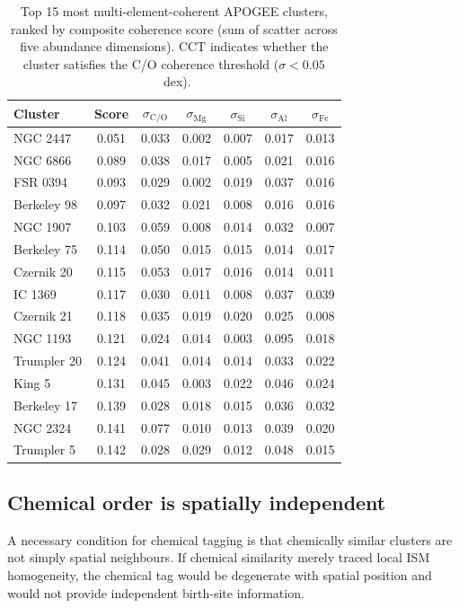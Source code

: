 \documentclass[fleqn,usenatbib]{mnras}
\begin{document}
\begin{table}
\centering
\caption{Top 15 most multi-element-coherent APOGEE clusters, ranked by composite coherence score (sum of scatter across five abundance dimensions). CCT indicates whether the cluster satisfies the C/O coherence threshold ($\sigma < 0.05$~dex).}
\label{tab:coherent_clusters}
\begin{tabular}{lcccccc}
\toprule
Cluster & Score & $\sigma_{\mathrm{C/O}}$ & $\sigma_{\mathrm{Mg}}$ & $\sigma_{\mathrm{Si}}$ & $\sigma_{\mathrm{Al}}$ & $\sigma_{\mathrm{Fe}}$ \\
\midrule
NGC 2447    & 0.051 & 0.033 & 0.002 & 0.007 & 0.017 & 0.013 \\
NGC 6866    & 0.089 & 0.038 & 0.017 & 0.005 & 0.021 & 0.016 \\
FSR 0394    & 0.093 & 0.029 & 0.002 & 0.019 & 0.037 & 0.016 \\
Berkeley 98 & 0.097 & 0.032 & 0.021 & 0.008 & 0.016 & 0.016 \\
NGC 1907    & 0.103 & 0.059 & 0.008 & 0.014 & 0.032 & 0.007 \\
Berkeley 75 & 0.114 & 0.050 & 0.015 & 0.015 & 0.014 & 0.017 \\
Czernik 20  & 0.115 & 0.053 & 0.017 & 0.016 & 0.014 & 0.011 \\
IC 1369     & 0.117 & 0.030 & 0.011 & 0.008 & 0.037 & 0.039 \\
Czernik 21  & 0.118 & 0.035 & 0.019 & 0.020 & 0.025 & 0.008 \\
NGC 1193    & 0.121 & 0.024 & 0.014 & 0.003 & 0.095 & 0.018 \\
Trumpler 20 & 0.124 & 0.041 & 0.014 & 0.014 & 0.033 & 0.022 \\
King 5      & 0.131 & 0.045 & 0.003 & 0.022 & 0.046 & 0.024 \\
Berkeley 17 & 0.139 & 0.028 & 0.018 & 0.015 & 0.036 & 0.032 \\
NGC 2324    & 0.141 & 0.077 & 0.010 & 0.013 & 0.039 & 0.020 \\
Trumpler 5  & 0.142 & 0.028 & 0.029 & 0.012 & 0.048 & 0.015 \\
\bottomrule
\end{tabular}
\end{table}


\subsection{Chemical order is spatially independent}
\label{sec:spatial}

A necessary condition for chemical tagging is that chemically similar clusters are not simply spatial neighbours.
If chemical similarity merely traced local ISM homogeneity, the chemical tag would be degenerate with spatial position and would not provide independent birth-site information.
\end{document}
